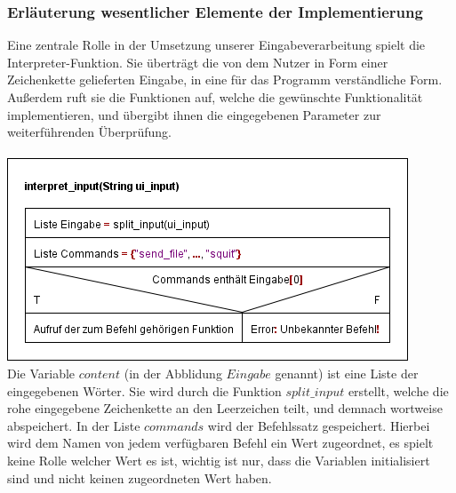 \subsubsection{Erläuterung wesentlicher Elemente der Implementierung}
Eine zentrale Rolle in der Umsetzung unserer Eingabeverarbeitung spielt die Interpreter-Funktion. Sie überträgt die von dem Nutzer in Form einer Zeichenkette gelieferten Eingabe, in eine für das Programm verständliche Form. Außerdem ruft sie die Funktionen auf, welche die gewünschte Funktionalität implementieren, und übergibt ihnen die eingegebenen Parameter zur weiterführenden Überprüfung.\\\hfill\\
\includegraphics[scale=0.75]{templ}\\
Die Variable $content$ (in der Abblidung $Eingabe$ genannt) ist eine Liste der eingegebenen Wörter. Sie wird durch die Funktion $split\_input$ erstellt, welche die rohe eingegebene Zeichenkette an den Leerzeichen teilt, und demnach wortweise abspeichert. In der Liste $commands$ wird der Befehlssatz gespeichert. 
Hierbei wird dem Namen von jedem verfügbaren Befehl ein Wert zugeordnet, es spielt keine Rolle welcher Wert es ist, wichtig ist nur, dass die Variablen initialisiert sind und nicht keinen zugeordneten Wert haben. 
